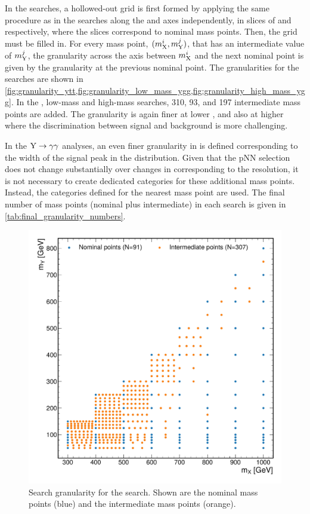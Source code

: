In the \XYH searches, a hollowed-out grid is first formed by applying the same procedure as in the \XHH searches along the \mX and \mY axes independently, in slices of \mY and \mX respectively, where the slices correspond to nominal mass points. Then, the grid must be filled in. For every mass point, $(m_{\mathrm{X}}^i, m_{\mathrm{Y}}^j)$, that has an intermediate value of $m_{\mathrm{Y}}^j$, the granularity across the \mX axis between $m_{\mathrm{X}}^i$ and the next nominal \mX point is given by the granularity at the previous nominal \mY point. The granularities for the \XYH searches are shown in \cref{fig:granularity_ytt,fig:granularity_low_mass_ygg,fig:granularity_high_mass_ygg}. In the \XYttHgg, low-mass \XYggHtt and high-mass \XYggHtt searches, 310, 93, and 197 intermediate mass points are added. The granularity is again finer at lower \mX, and also at higher \mY where the discrimination between signal and background is more challenging. 

In the $\mathrm{Y} \to \gamma\gamma$ analyses, an even finer granularity in \mY is defined corresponding to the width of the signal peak in the \mgg distribution. Given that the pNN selection does not change substantially over changes in \mY corresponding to the \mgg resolution, it is not necessary to create dedicated categories for these additional mass points. Instead, the categories defined for the nearest mass point are used. The final number of mass points (nominal plus intermediate) in each search is given in \cref{tab:final_granularity_numbers}. 

\begin{figure}
  \centering
  \includegraphics[width=\textwidth]{Figures/Dihiggs/results/LimitGranularity/mass_grid_Y_tautau.pdf}
  \caption[Search Granularity for the \XYttHgg Search]{Search granularity for the \XYttHgg search. Shown are the nominal mass points (blue) and the intermediate mass points (orange).}\label{fig:granularity_ytt}
\end{figure}

